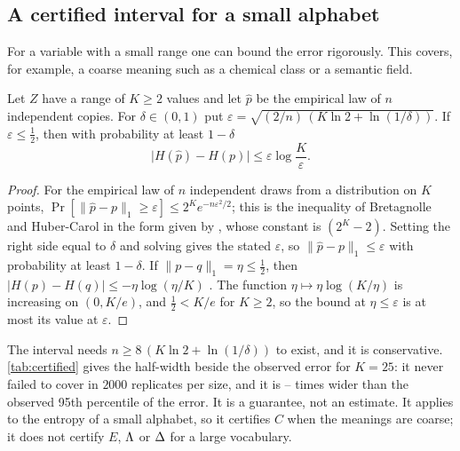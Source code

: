 \subsection{A certified interval for a small alphabet}
For a variable with a small range one can bound the error rigorously. This covers, for example, a coarse meaning such as a chemical class or a semantic field.
\begin{proposition}\label{prop:cert}
Let $Z$ have a range of $K\ge2$ values and let $\hat p$ be the empirical law of $n$ independent copies. For $\delta\in(0,1)$ put
$\varepsilon=\sqrt{(2/n)\,(K\ln2+\ln(1/\delta))}$. If $\varepsilon\le\tfrac12$, then with probability at least $1-\delta$
\begin{equation}
\bigl|H(\hat p)-H(p)\bigr|\le\varepsilon\log\frac{K}{\varepsilon}.
\end{equation}
\end{proposition}
\begin{proof}
For the empirical law of $n$ independent draws from a distribution on $K$ points, $\Pr[\lVert\hat p-p\rVert_1\ge\varepsilon]\le2^Ke^{-n\varepsilon^2/2}$; this is the inequality of Bretagnolle and Huber-Carol in the form given by \citet{weissman2003}, whose constant is $(2^K-2)$. Setting the right side equal to $\delta$ and solving gives the stated $\varepsilon$, so $\lVert\hat p-p\rVert_1\le\varepsilon$ with probability at least $1-\delta$. If $\lVert p-q\rVert_1=\eta\le\tfrac12$, then $|H(p)-H(q)|\le-\eta\log(\eta/K)$ \citep[Thm.\,17.3.3]{cover2006}. The function $\eta\mapsto\eta\log(K/\eta)$ is increasing on $(0,K/e)$, and $\tfrac12<K/e$ for $K\ge2$, so the bound at $\eta\le\varepsilon$ is at most its value at $\varepsilon$.
\end{proof}
The interval needs $n\ge8\,(K\ln2+\ln(1/\delta))$ to exist, and it is conservative. \cref{tab:certified} gives the half-width beside the observed error for $K=25$: it never failed to cover in $2000$ replicates per size, and it is \CertRatioLo--\CertRatioHi{} times wider than the observed 95th percentile of the error. It is a guarantee, not an estimate. It applies to the entropy of a small alphabet, so it certifies $C$ when the meanings are coarse; it does not certify $E$, $\Lambda$ or $\Delta$ for a large vocabulary.
\begin{table}[tbp]
\caption{Certified half-width of \cref{prop:cert} for $K=25$ categories with probabilities proportional to $1/k$, at $\delta=0.05$, against the observed error over $2000$ replicates of each sample size.}\label{tab:certified}
\centering\small

\end{table}

